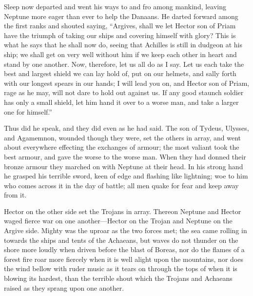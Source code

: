 Sleep now departed and went his ways to and fro among mankind, leaving
Neptune more eager than ever to help the Danaans. He darted forward among
the first ranks and shouted saying, “Argives, shall we let Hector son of
Priam have the triumph of taking our ships and covering himself with
glory? This is what he says that he shall now do, seeing that Achilles is
still in dudgeon at his ship; we shall get on very well without him if we
keep each other in heart and stand by one another. Now, therefore, let us
all do as I say. Let us each take the best and largest shield we can lay
hold of, put on our helmets, and sally forth with our longest spears in
our hands; I will lead you on, and Hector son of Priam, rage as he may,
will not dare to hold out against us. If any good staunch soldier has only
a small shield, let him hand it over to a worse man, and take a larger one
for himself.”

Thus did he speak, and they did even as he had said. The son of Tydeus,
Ulysses, and Agamemnon, wounded though they were, set the others in array,
and went about everywhere effecting the exchanges of armour; the most
valiant took the best armour, and gave the worse to the worse man. When
they had donned their bronze armour they marched on with Neptune at their
head. In his strong hand he grasped his terrible sword, keen of edge and
flashing like lightning; woe to him who comes across it in the day of
battle; all men quake for fear and keep away from it.

Hector on the other side set the Trojans in array. Thereon Neptune and
Hector waged fierce war on one another—Hector on the Trojan and
Neptune on the Argive side. Mighty was the uproar as the two forces met;
the sea came rolling in towards the ships and tents of the Achaeans, but
waves do not thunder on the shore more loudly when driven before the blast
of Boreas, nor do the flames of a forest fire roar more fiercely when it
is well alight upon the mountains, nor does the wind bellow with ruder
music as it tears on through the tops of when it is blowing its hardest,
than the terrible shout which the Trojans and Achaeans raised as they
sprang upon one another.

